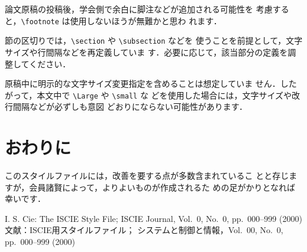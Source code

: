 \documentclass{jarticle}
\begin{document}
論文原稿の投稿後，学会側で余白に脚注などが追加される可能性を
考慮すると，\verb+\footnote+ は使用しないほうが無難かと思わ
れます．

節の区切りでは，\verb+\section+ や \verb+\subsection+ などを
使うことを前提として，文字サイズや行間隔などを再定義していま
す．必要に応じて，該当部分の定義を調整してください．

原稿中に明示的な文字サイズ変更指定を含めることは想定していま
せん．したがって，本文中で \verb+\Large+ や \verb+\small+ な
どを使用した場合には，文字サイズや改行間隔などが必ずしも意図
どおりにならない可能性があります．

\section{おわりに}

このスタイルファイルには，改善を要する点が多数含まれているこ
とと存じますが，会員諸賢によって，よりよいものが作成されるた
めの足がかりとなれば幸いです．

\renewcommand{\refname}{参考文献}
\begin{thebibliography}{2}
I. S. Cie: The ISCIE Style File;
ISCIE Journal, Vol.~0, No.~0, pp.~000--999 (2000)
文献：ISCIE用スタイルファイル；
システムと制御と情報，Vol.~00, No.~0, pp.~000--999 (2000)
\end{thebibliography}
\end{document}

